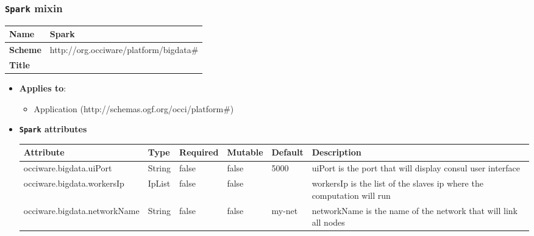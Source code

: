 \subsubsection{\texttt{Spark} mixin}
\begin{center}
\begin{tabular}{|l|l|}
  \hline
  \textbf{Name} & Spark \\
  \hline  
  \textbf{Scheme} & http://org.occiware/platform/bigdata\# \\
  \hline
  \textbf{Title} &  \\
  \hline
\end{tabular}
\end{center}
\begin{itemize}
\item \textbf{Applies to}:
\begin{itemize}
	\item Application (http://schemas.ogf.org/occi/platform\#)
\end{itemize}
\end{itemize} 

\begin{itemize}
\item \textbf{\texttt{Spark} attributes}

\begin{tabularx}{\textwidth}{|l|l|p{1.4cm}|p{1.3cm}|l|X|}
  \hline
  \textbf{Attribute} & \textbf{Type} & \textbf{Required} & \textbf{Mutable} & \textbf{Default} & \textbf{Description} \\
  \hline  
  occiware.bigdata.uiPort & String & false & false & 5000 & uiPort is the port that will display consul user interface \\
  \hline
  occiware.bigdata.workersIp & IpList & false & false &  & workersIp is the list of the slaves ip where the computation will run \\
  \hline
  occiware.bigdata.networkName & String & false & false & my-net & networkName is the name of the network that will link all nodes \\
  \hline
\end{tabularx}
\end{itemize}


 
